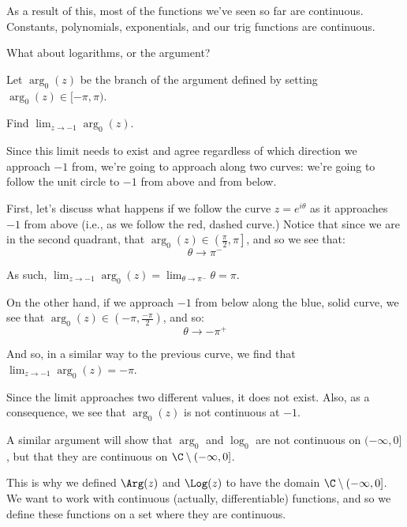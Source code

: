As a result of this, most of the functions we've seen so far are continuous. Constants, polynomials, exponentials, and our trig functions are continuous.

What about logarithms, or the argument?

\begin{ex}{}{} Let $\arg_0(z)$ be the branch of the argument defined by setting $\arg_0(z) \in [-\pi,\pi)$.

Find $\lim_{z\rightarrow -1} \arg_0(z)$.

Since this limit needs to exist and agree regardless of which direction we approach $-1$ from, we're going to approach along two curves: we're going to follow the unit circle to $-1$ from above and from below.

\begin{center}
\end{center}


First, let's discuss what happens if we follow the curve $z = e^{i\theta}$ as it approaches $-1$ from above (i.e., as we follow the red, dashed curve.) Notice that since we are in the second quadrant, that $\arg_0(z) \in \left(\frac{\pi}{2},\pi\right]$, and so we see that:
$$\theta \rightarrow \pi^{-}$$

As such, $\lim_{z\rightarrow -1} \arg_0(z) = \lim_{\theta \rightarrow \pi^-} \theta = \pi$.

On the other hand, if we approach $-1$ from below along the blue, solid curve, we see that $\arg_0(z) \in \left(-\pi,\frac{-\pi}{2}\right)$, and so:
$$\theta\rightarrow -\pi^+$$

And so, in a similar way to the previous curve, we find that $\lim_{z\rightarrow -1} \arg_0(z) = -\pi$.

Since the limit approaches two different values, it does not exist. Also, as a consequence, we see that $\arg_0(z)$ is not continuous at $-1$.
\end{ex}

\begin{note} A similar argument will show that $\arg_0$ and $\log_0$ are not continuous on $(-\infty,0]$, but that they are continuous on $\C \setminus (-\infty, 0]$.

This is why we defined $\Arg(z)$ and $\Log(z)$ to have the domain $\C\setminus (-\infty,0]$. We want to work with continuous (actually, differentiable) functions, and so we define these functions on a set where they are continuous.\end{note}


